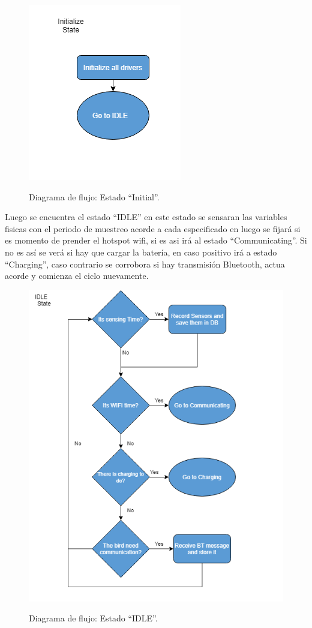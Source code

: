 \begin{figure}[H]
	\centering
	\includegraphics[width=0.4\linewidth]{ImagenesIngenieria de Detalle/diagrama_flujo_initial}
	\label{fig:Diagrama_de_flujo_init}
	\caption{Diagrama de flujo: Estado ``Initial''.}
\end{figure}
Luego se encuentra el estado ``IDLE'' en este estado se sensaran las variables fisicas con el periodo de muestreo acorde a cada especificado en 
luego se fijará si es momento de prender el hotspot wifi, si es asi irá al estado ``Communicating''. Si no es as\'i se ver\'a si hay que cargar la bater\'ia, en caso positivo ir\'a a estado ``Charging'', caso contrario se corrobora si hay transmisi\'on Bluetooth, actua acorde  y comienza el ciclo nuevamente.
\begin{figure}[H]
	\centering
	\includegraphics[width=0.7\linewidth]{ImagenesIngenieria de Detalle/diagrama_flujo_idle}
	\label{fig:Diagrama_de_flujo_idle}
	\caption{Diagrama de flujo: Estado ``IDLE''.}
\end{figure}

